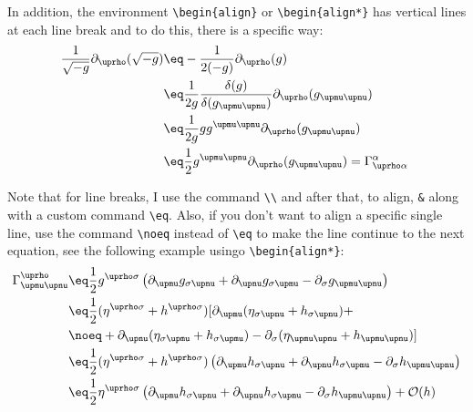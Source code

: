         In addition, the environment \verb|\begin{align}| or \verb|\begin{align*}| has vertical lines at each line break and to do this, there is a specific way:
            \begin{align}
                \dfrac{1}{\sqrt{-g}}\partial_{\uprho}(\sqrt{-g}) & \eq -\dfrac{1}{2(-g)}\partial_{\uprho}(g) \label{eq: 2} \\
                & \eq \dfrac{1}{2g}\dfrac{\delta(g)}{\delta(g_{\upmu\upnu})}\partial_{\uprho}(g_{\upmu\upnu}) \nonumber \\
                & \eq \dfrac{1}{2g}gg^{\upmu\upnu}\partial_{\uprho}(g_{\upmu\upnu}) \nonumber \\
                & \eq \dfrac{1}{2}g^{\upmu\upnu}\partial_{\uprho}(g_{\upmu\upnu}) = \Gamma^{\alpha}_{\uprho\alpha}\ \label{eq:3}
            \end{align}

        Note that for line breaks, I use the command \verb|\\| and after that, to align, \verb|&| along with a custom command \verb|\eq|. Also, if you don't want to align a specific single line, use the command \verb|\noeq| instead of \verb|\eq| to make the line continue to the next equation, see the following example usingo \verb|\begin{align*}|:
            \begin{align*}
                \Gamma^{\uprho}_{\upmu\upnu} & \eq \dfrac{1}{2}g^{\uprho\sigma}\left(
                    \partial_{\upmu}g_{\sigma\upnu} + 
                    \partial_{\upnu}g_{\sigma\upmu} -
                    \partial_{\sigma}g_{\upmu\upnu}
                \right) \\
                & \eq \dfrac{1}{2}(\eta^{\uprho\sigma} + h^{\uprho\sigma})[
                    \partial_{\upmu}(\eta_{\sigma\upnu} + h_{\sigma\upnu}) +  \\
                & \noeq + \partial_{\upnu}(\eta_{\sigma\upmu} + h_{\sigma\upmu}) -
                    \partial_{\sigma}(\eta_{\upmu\upnu} + h_{\upmu\upnu}) ]  \\
                & \eq \dfrac{1}{2}(\eta^{\uprho\sigma} + h^{\uprho\sigma})\left(
                    \partial_{\upmu}h_{\sigma\upnu} + 
                    \partial_{\upnu}h_{\sigma\upmu} - 
                    \partial_{\sigma}h_{\upmu\upnu}
                \right)  \\
                & \eq \dfrac{1}{2}\eta^{\uprho\sigma} \left(
                    \partial_{\upmu}h_{\sigma\upnu} + 
                    \partial_{\upnu}h_{\sigma\upmu} - 
                    \partial_{\sigma}h_{\upmu\upnu}
                \right) + \mathcal{O}(h) 
            \end{align*}
    
